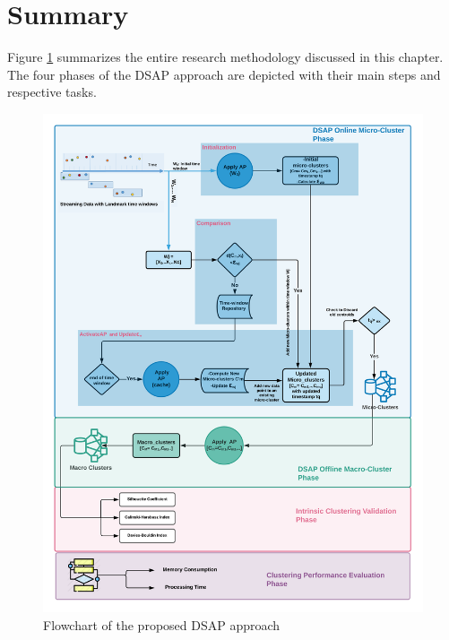 \newpage
\section{Summary}

Figure \ref{frame} summarizes the entire research methodology discussed in this chapter. The four phases of the DSAP approach are depicted with their main steps and respective tasks. 




\begin{figure}[!ht]
\centering
\includegraphics[width =1\textwidth]{image/Chapters/Chapter4/dsapflowchart1.png} 
\caption{Flowchart of the proposed DSAP approach}
\label{frame}
\end{figure}

